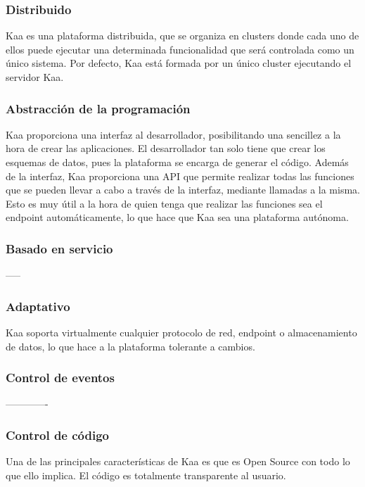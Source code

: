 \documentclass[12pt, twoside]{book}
\begin{document}
\subsubsection*{Distribuido}
Kaa es una plataforma distribuida, que se organiza en clusters donde cada uno de ellos puede ejecutar una determinada funcionalidad que será controlada como un único sistema. Por defecto, Kaa está formada por un único cluster ejecutando el servidor Kaa. 




\subsubsection*{Abstracción de la programación}
Kaa proporciona una interfaz al desarrollador, posibilitando una sencillez a la hora de crear las aplicaciones. El desarrollador tan solo tiene que crear los esquemas de datos, pues la plataforma se encarga de generar el código. Además de la interfaz, Kaa proporciona una API que permite realizar todas las funciones que se pueden llevar a cabo a través de la interfaz, mediante llamadas a la misma. Esto es muy útil a la hora de quien tenga que realizar las funciones sea el endpoint automáticamente, lo que hace que Kaa sea una plataforma autónoma.



\subsubsection*{Basado en servicio}
-----



\subsubsection*{Adaptativo}
Kaa soporta virtualmente cualquier protocolo de red, endpoint o almacenamiento de datos, lo que hace a la plataforma tolerante a cambios.



\subsubsection*{Control de eventos}
-------------



\subsubsection*{Control de código}
Una de las principales características de Kaa es que es Open Source con todo lo que ello implica. El código es totalmente transparente al usuario.
\end{document}
